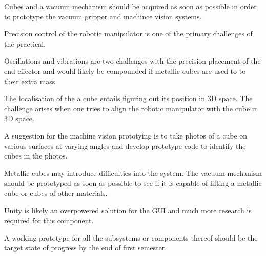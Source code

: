 \begin{compactitem}
    \item Cubes and a vacuum mechanism should be acquired as soon as possible in order to prototype the vacuum gripper and machince vision systems.
    \item Precision control of the robotic manipulator is one of the primary challenges of the practical.
    \item Oscillations and vibrations are two challenges with the precision placement of the end-effector and would likely be compounded if metallic cubes are used to to their extra mass.
    \item The localisation of the a cube entails figuring out its position in 3D space. The challenge arises when one tries to align the robotic manipulator with the cube in 3D space.
    \item A suggestion for the machine vision prototying is to take photos of a cube on various surfaces at varying angles and develop prototype code to identify the cubes in the photos.
    \item Metallic cubes may introduce difficulties into the system. The vacuum mechanism should be prototyped as soon as possible to see if it is capable of lifting a metallic cube or cubes of other materials.
    \item Unity is likely an overpowered solution for the \ac{GUI} and much more research is required for this component.
    \item A working prototype for all the subsystems or components thereof should be the target state of progress by the end of first semester.
\end{compactitem}

\pendsign